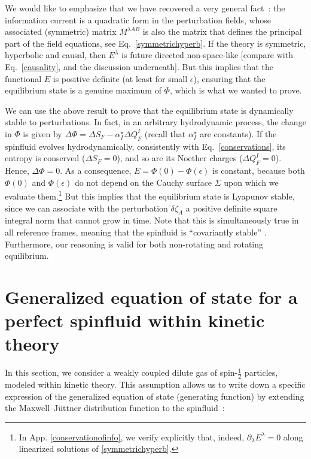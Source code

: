 \documentclass[12pt,aps,prd,nofootinbib,noshowkeys,noshowpacs,longbibliography,
superscriptaddress,tightenlines,floatfix,preprintnumbers]{revtex4-2}
\begin{document}
We would like to emphasize that we have recovered a very general fact~\cite{GavassinoCasmir2022}: the information current is a quadratic form in the perturbation fields, whose associated (symmetric) matrix $M^{\lambda AB}$ is also the matrix that defines the principal part of the field equations, see Eq.~\eqref{symmetrichyperb}. If the theory is symmetric, hyperbolic and causal, then $E^\lambda$ is future directed non-space-like [compare with Eq.~\eqref{causality}, and the discussion underneath]. But this implies that the functional $E$ is positive definite (at least for small $\epsilon$), ensuring that the equilibrium state is a genuine maximum of $\Phi$, which is what we wanted to prove.

We can use the above result to prove that the equilibrium state is dynamically stable to perturbations. In fact, in an arbitrary hydrodynamic process, the change in $\Phi$ is given by $\Delta \Phi= \Delta S_F - \alpha^\star_I \Delta Q^I_F$ (recall that $\alpha^\star_I$ are constants). If the spinfluid evolves hydrodynamically, consistently with Eq.~\eqref{conservations}, its entropy is conserved ($\Delta S_F=0$), and so are its Noether charges ($\Delta Q_F^I=0$). Hence, $\Delta \Phi=0$. As a consequence, $E=\Phi(0)-\Phi(\epsilon)$ is constant, because both $\Phi(0)$ and $\Phi(\epsilon)$ do not depend on the Cauchy surface $\Sigma$ upon which we evaluate them.\footnote{In App. \ref{conservationofinfo}, we verify explicitly that, indeed, $\partial_\lambda E^\lambda=0$ along linearized solutions of \eqref{symmetrichyperb}.} But this implies that the equilibrium state is Lyapunov stable, since we can associate with the perturbation $\delta \zeta_A$ a positive definite square integral norm that cannot grow in time. Note that this is simultaneously true in all reference frames, meaning that the spinfluid is ``covariantly stable'' \cite{GavassinoSuperluminal2021}. Furthermore, our reasoning is valid for both non-rotating and  rotating equilibrium. 
{\color{black}
\section{Generalized equation of state for a perfect spinfluid within kinetic theory}
\label{sec:Generalized equation of state}
}
{\color{black}In this section, we consider a weakly coupled dilute gas of spin-$\frac{1}{2}$ particles, modeled within kinetic theory. This assumption allows us to write down a specific expression of the generalized equation of state (generating function) by extending the Maxwell--Jüttner distribution function to the spinfluid~\cite{Florkowski:2018fap,Weickgenannt:2020aaf}: }
\end{document}
